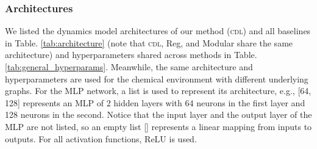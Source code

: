 \subsubsection{Architectures}
\label{app:architectures}
We listed the dynamics model architectures of our method (\textsc{cdl}) and all baselines in Table. \ref{tab:architecture} (note that \textsc{cdl}, Reg, and Modular share the same architecture) and hyperparameters shared across methods in Table. \ref{tab:general_hyperparams}. Meanwhile, the same architecture and hyperparameters are used for the chemical environment with different underlying graphs. For the MLP network, a list is used to represent its architecture, e.g., [64, 128] represents an MLP of 2 hidden layers with 64 neurons in the first layer and 128 neurons in the second. Notice that the input layer and the output layer of the MLP are not listed, so an empty list [] represents a linear mapping from inputs to outputs. For all activation functions, ReLU is used.

